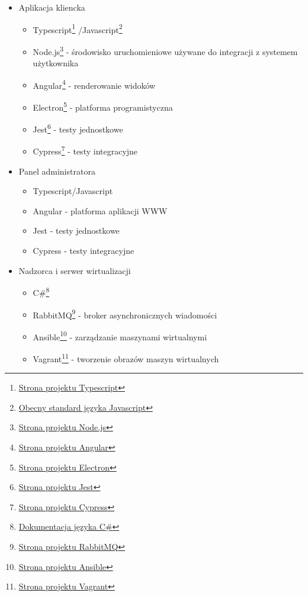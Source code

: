 \documentclass[../deliverable-two.tex]{subfiles}
\begin{document}
\begin{itemize}
    \item Aplikacja kliencka
          \begin{itemize}
              \item Typescript\footnote{\href{https://www.typescriptlang.org}{Strona projektu Typescript}}
                    /Javascript\footnote{\href{https://www.ecma-international.org/publications-and-standards/standards/ecma-262}{Obecny standard języka Javascript}}
              \item Node.js\footnote{\href{https://nodejs.org/en}{Strona projektu Node.js}} - środowisko uruchomieniowe używane do integracji z systemem użytkownika
              \item Angular\footnote{\href{https://angular.io/}{Strona projektu Angular}} - renderowanie widoków
              \item Electron\footnote{\href{https://www.electronjs.org/}{Strona projektu Electron}} - platforma programistyczna
              \item Jest\footnote{\href{https://jestjs.io/}{Strona projektu Jest}} - testy jednostkowe
              \item Cypress\footnote{\href{https://www.cypress.io/}{Strona projektu Cypress}} - testy integracyjne
          \end{itemize}
    \item Panel administratora
          \begin{itemize}
              \item Typescript/Javascript
              \item Angular - platforma aplikacji WWW
              \item Jest - testy jednostkowe
              \item Cypress - testy integracyjne
          \end{itemize}
    \item Nadzorca i serwer wirtualizacji
          \begin{itemize}
              \item C\#\footnote{\href{https://docs.microsoft.com/en-us/dotnet/csharp/}{Dokumentacja języka C\#}}
              \item RabbitMQ\footnote{\href{https://www.rabbitmq.com/}{Strona projektu RabbitMQ}} - broker asynchronicznych wiadomości
              \item Ansible\footnote{\href{https://www.ansible.com/}{Strona projektu Ansible}} - zarządzanie maszynami wirtualnymi
              \item Vagrant\footnote{\href{https://www.vagrantup.com/}{Strona projektu Vagrant}} - tworzenie obrazów maszyn wirtualnych

\end{itemize}
\end{itemize}
\end{document}
